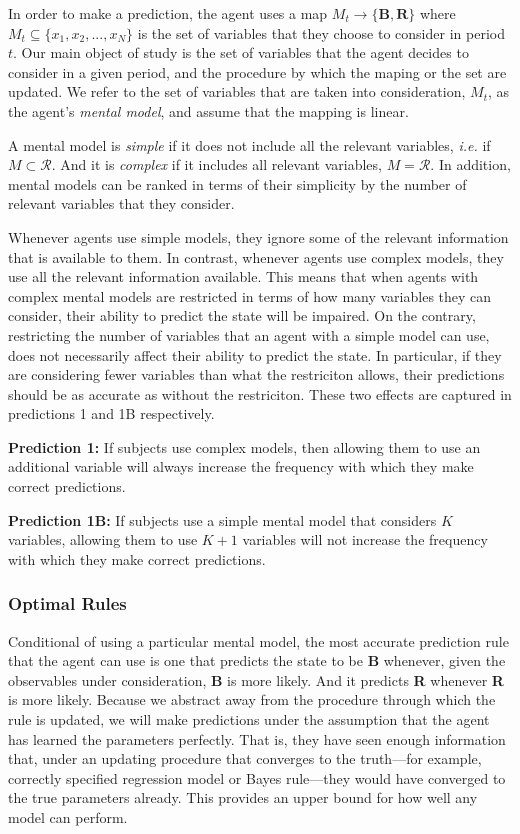 \documentclass[
  12pt,
]{article}
\begin{document}
In order to make a prediction, the agent uses a map
\(M_t\to \{\textbf{B}, \textbf{R}\}\) where
\(M_t \subseteq \{x_1, x_2, ..., x_N\}\) is the set of variables that
they choose to consider in period \(t\). Our main object of study is the
set of variables that the agent decides to consider in a given period,
and the procedure by which the maping or the set are updated. We refer
to the set of variables that are taken into consideration, \(M_t\), as
the agent's \emph{mental model}, and assume that the mapping is linear.

A mental model is \emph{simple} if it does not include all the relevant
variables, \emph{i.e.} if \(M\subset \mathcal{R}\). And it is
\emph{complex} if it includes all relevant variables, \(M=\mathcal{R}\).
In addition, mental models can be ranked in terms of their simplicity by
the number of relevant variables that they consider.

Whenever agents use simple models, they ignore some of the relevant
information that is available to them. In contrast, whenever agents use
complex models, they use all the relevant information available. This
means that when agents with complex mental models are restricted in
terms of how many variables they can consider, their ability to predict
the state will be impaired. On the contrary, restricting the number of
variables that an agent with a simple model can use, does not
necessarily affect their ability to predict the state. In particular, if
they are considering fewer variables than what the restriciton allows,
their predictions should be as accurate as without the restriciton.
These two effects are captured in predictions 1 and 1B respectively.

\textbf{Prediction 1:} If subjects use complex models, then allowing
them to use an additional variable will always increase the frequency
with which they make correct predictions.

\textbf{Prediction 1B:} If subjects use a simple mental model that
considers \(K\) variables, allowing them to use \(K+1\) variables will
not increase the frequency with which they make correct predictions.

\hypertarget{optimal-rules}{%
\subsubsection{Optimal Rules}\label{optimal-rules}}

Conditional of using a particular mental model, the most accurate
prediction rule that the agent can use is one that predicts the state to
be \textbf{B} whenever, given the observables under consideration,
\textbf{B} is more likely. And it predicts \textbf{R} whenever
\textbf{R} is more likely. Because we abstract away from the procedure
through which the rule is updated, we will make predictions under the
assumption that the agent has learned the parameters perfectly. That is,
they have seen enough information that, under an updating procedure that
converges to the truth---for example, correctly specified regression
model or Bayes rule---they would have converged to the true parameters
already. This provides an upper bound for how well any model can
perform.
\end{document}

